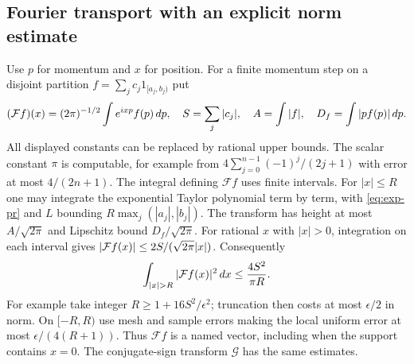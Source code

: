 \subsection{Fourier transport with an explicit norm estimate}

Use $p$ for momentum and $x$ for position. For a finite momentum step on a disjoint partition
$f=\sum_j c_j1_{[a_j,b_j)}$ put
\[
 ({\cal F}f)(x)=(2\pi)^{-1/2}\int e^{ixp}f(p)\,dp,\quad
 S=\sum_j|c_j|,\quad A=\int |f|,\quad D_f=\int |p f(p)|\,dp .
\]
All displayed constants can be replaced by rational upper bounds.
The scalar constant $\pi$ is computable, for example from
$4\sum_{j=0}^{n-1}(-1)^j/(2j+1)$ with error at most $4/(2n+1)$.
The integral defining $\mathcal F f$ uses finite intervals. For $|x|\le R$
one may integrate the exponential Taylor polynomial term by term, with
\eqref{eq:exp-pr} and $L$ bounding $R\max_j(|a_j|,|b_j|)$.
The transform has height at most $A/\sqrt{2\pi}$ and Lipschitz
bound $D_f/\sqrt{2\pi}$. For rational $x$ with $|x|>0$, integration on each interval gives
$|{\cal F}f(x)|\le2S/(\sqrt{2\pi}|x|)$. Consequently
\begin{equation}\label{eq:fouriertail}
 \int_{|x|>R}|{\cal F}f(x)|^2\,dx\le {4S^2\over \pi R}.
\end{equation}
For example take integer $R\ge1+16S^2/\epsilon^2$; truncation then
costs at most $\epsilon/2$ in norm. On $[-R,R)$ use mesh and sample
errors making the local uniform error at most
$\epsilon/(4(R+1))$. Thus $\mathcal F f$ is a named vector, including
when the support contains $x=0$. The conjugate-sign transform
$\mathcal G$ has the same estimates.

